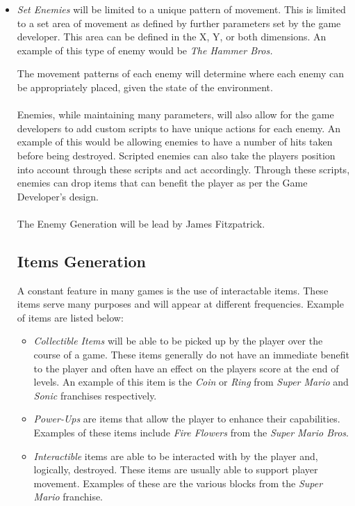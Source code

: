 \documentclass[pdftex,12pt,letter]{article}
\begin{document}
\begin{itemize}
\begin{itemize}
\item \textit{Set Enemies} will be limited to a unique pattern of movement. This is limited to a set area of movement as defined by further parameters set by the game developer. This area can be defined in the X, Y, or both dimensions. An example of this type of enemy would be \textit{The Hammer Bros.}\\

\endgroup

The movement patterns of each enemy will determine where each enemy can be appropriately placed, given the state of the environment. 
\\\\
Enemies, while maintaining many parameters, will also allow for the game developers to add custom scripts to have unique actions for each enemy. An example of this would be allowing enemies to have a number of hits taken before being destroyed. Scripted enemies can also take the players position into account through these scripts and act accordingly. Through these scripts, enemies can drop items that can benefit the player as per the Game Developer's design. 
\\\\
The Enemy Generation will be lead by James Fitzpatrick.

\subsection{Items Generation}
A constant feature in many games is the use of interactable items. These items serve many purposes and will appear at different frequencies. Example of items are listed below:
\begin{itemize}
\item \textit{Collectible Items} will be able to be picked up by the player over the course of a game. These items generally do not have an immediate benefit to the player and often have an effect on the players score at the end of levels. An example of this item is the \textit{Coin} or \textit{Ring} from \textit{Super Mario} and \textit{Sonic} franchises respectively. 

\item \textit{Power-Ups} are items that allow the player to enhance their capabilities. Examples of these items include \textit{Fire Flowers} from the \textit{Super Mario Bros}.

\item \textit{Interactible} items are able to be interacted with by the player and, logically, destroyed. These items are usually able to support player movement. Examples of these are the various blocks from the \textit{Super Mario} franchise. \\


\end{itemize}
\end{itemize}
\end{itemize}
\end{document}
